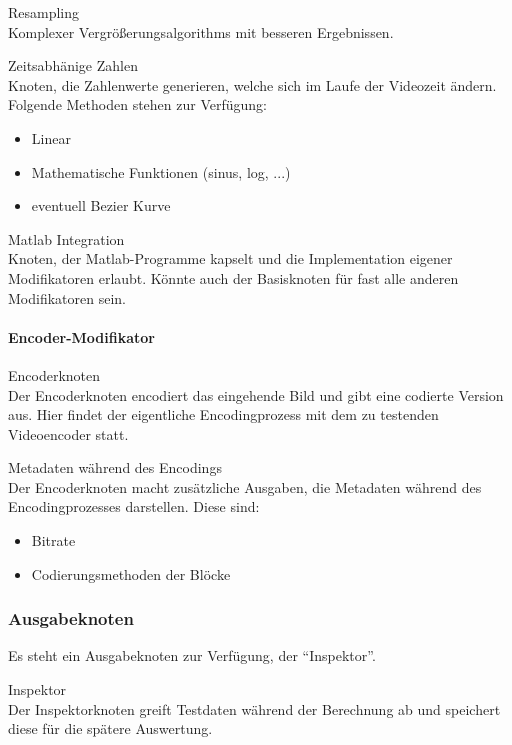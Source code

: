 \begin{speclist}[F]
\optspec Resampling \\
Komplexer Vergrößerungsalgorithms mit besseren Ergebnissen.

\optspec Zeitsabhänige Zahlen \\
Knoten, die Zahlenwerte generieren, welche sich im Laufe der Videozeit ändern. Folgende Methoden stehen zur Verfügung:
\begin{itemize}
	\item Linear
	\item Mathematische Funktionen (sinus, log, ...)
	\item eventuell Bezier Kurve
\end{itemize}

\optspec Matlab Integration \\
Knoten, der Matlab-Programme kapselt und die Implementation eigener Modifikatoren erlaubt. Könnte auch der Basisknoten für fast alle anderen Modifikatoren sein.

\end{speclist}

\paragraph{Encoder-Modifikator}

\begin{speclist}[F]

\spec Encoderknoten \\
Der Encoderknoten encodiert das eingehende Bild und gibt eine codierte Version aus. Hier findet der eigentliche Encodingprozess mit dem zu testenden Videoencoder statt.

\optspec Metadaten während des Encodings \\
Der Encoderknoten macht zusätzliche Ausgaben, die Metadaten während des Encodingprozesses darstellen. Diese sind:
\begin{itemize}
	\item Bitrate
	\item Codierungsmethoden der Blöcke
\end{itemize}

\end{speclist}

\subsubsection{Ausgabeknoten}
Es steht ein Ausgabeknoten zur Verfügung, der "`Inspektor"'.

\begin{speclist}[F]
\setcounter{specnum}{23010}

\spec Inspektor \\
Der Inspektorknoten greift Testdaten während der Berechnung ab und speichert diese für die spätere Auswertung.

\end{speclist}

